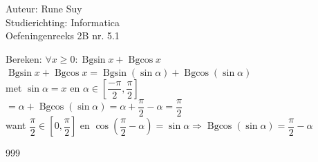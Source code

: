 \documentclass[a4paper]{article}
\newcommand{\Bgsin}{\operatorname{Bgsin}}
\newcommand{\Bgcos}{\operatorname{Bgcos}}
\begin{document}
  
\noindent \large Auteur: Rune Suy \\
\noindent \large Studierichting: Informatica\\
\noindent \large Oefeningenreeks 2B nr. 5.1\\

\medskip

\normalsize

Bereken: $\forall x \ge 0: \Bgsin x + \Bgcos x$\\

$\Bgsin x + \Bgcos x = \Bgsin(\sin \alpha) + \Bgcos(\sin \alpha)$ \\

met $\sin \alpha = x$ en $\alpha \in \left[ \dfrac{-\pi}{2}, \dfrac{\pi}{2} \right]$ \\

$= \alpha + \Bgcos(\sin \alpha) = \alpha + \dfrac{\pi}{2} - \alpha = \dfrac{\pi}{2}$\\

want $\dfrac{\pi}{2} \in \left[0, \dfrac{\pi}{2}\right]$ en $\cos\left(\dfrac{\pi}{2}-\alpha\right) = \sin \alpha \Rightarrow \Bgcos(\sin \alpha) = \dfrac{\pi}{2} - \alpha$\\

\begin{thebibliography}{999}
\end{thebibliography}
\end{document}
